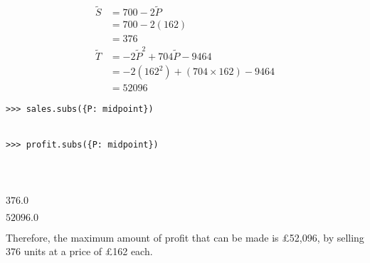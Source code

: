 \documentclass[12pt]{article}
\begin{document}
\begin{minipage}[t]{.6\textwidth} %
\begin{mdframed}[linewidth=0.5mm, backgroundcolor=cyan!10]
\vspace{-0.6cm}
\begin{align*}
\tilde{S} &= 700 - 2\tilde{P} \\
&= 700 - 2(162) \\
&= 376 \\[3mm]
\tilde{T} &= -2\tilde{P}^2 + 704\tilde{P} - 9464 \\
&= -2(162^2) + (704 \times 162) - 9464 \\
&= 52096
\end{align*}
\vspace{-0.85cm}
\end{mdframed}
\end{minipage} %
\begin{minipage}[t]{.4\textwidth} %
\begin{verbatim}
>>> sales.subs({P: midpoint})


>>> profit.subs({P: midpoint})




\end{verbatim}
\vspace{-3.8cm}

\hspace{0.5cm}\begin{minipage}{\textwidth}$376.0$\end{minipage} 

\vspace{1cm}

\hspace{0.5cm}\begin{minipage}{\textwidth}$52096.0$\end{minipage}
\end{minipage}

\vspace{0.5cm}

\begin{mdframed}[linewidth=0.5mm, backgroundcolor=orange!10]
Therefore, the maximum amount of profit that can be made is £52,096, by selling 376 units at a price of £162 each.
\end{mdframed}
\end{document}
